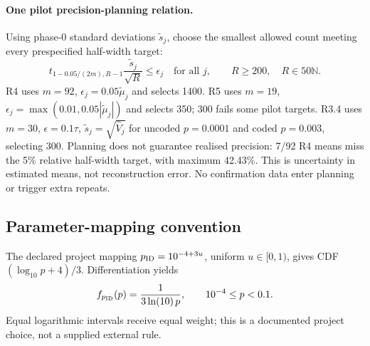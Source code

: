 \paragraph{One pilot precision-planning relation.}
Using phase-0 standard deviations $\widetilde s_j$, choose the smallest
allowed count meeting every prespecified half-width target:
\begin{equation}
 t_{1-0.05/(2m),R-1}\frac{\widetilde s_j}{\sqrt R}\leq\epsilon_j
 \quad\text{for all }j,\qquad R\geq200,\quad R\in50\mathbb N.
 \label{eq:app-pilot-planning}
\end{equation}
R4 uses $m=92$, $\epsilon_j=0.05\widetilde\mu_j$ and selects 1400.
R5 uses $m=19$, $\epsilon_j=\max(0.01,0.05|\widetilde\mu_j|)$ and selects
350; 300 fails some pilot targets. R3.4 uses $m=30$, $\epsilon=0.1\tau$,
$\widetilde s_j=\sqrt{\widehat V_j}$ for uncoded $p=0.0001$ and coded
$p=0.003$, selecting 300. Planning does not guarantee realised precision:
7/92 R4 means miss the 5\% relative half-width target, with maximum 42.43\%.
This is uncertainty in estimated means, not reconstruction error.
No confirmation data enter planning or trigger extra repeats.

\subsection{Parameter-mapping convention}
\label{app:random}
The declared project mapping $p_{\rm ID}=10^{-4+3u}$, uniform $u\in[0,1)$,
gives CDF $(\log_{10}p+4)/3$. Differentiation yields
\begin{equation}
 f_{p_{\rm ID}}(p)=\frac{1}{3\ln(10)\,p},
 \qquad 10^{-4}\le p<0.1.
 \label{eq:r33-density}
\end{equation}
Equal logarithmic intervals receive equal weight; this is a documented
project choice, not a supplied external rule.
